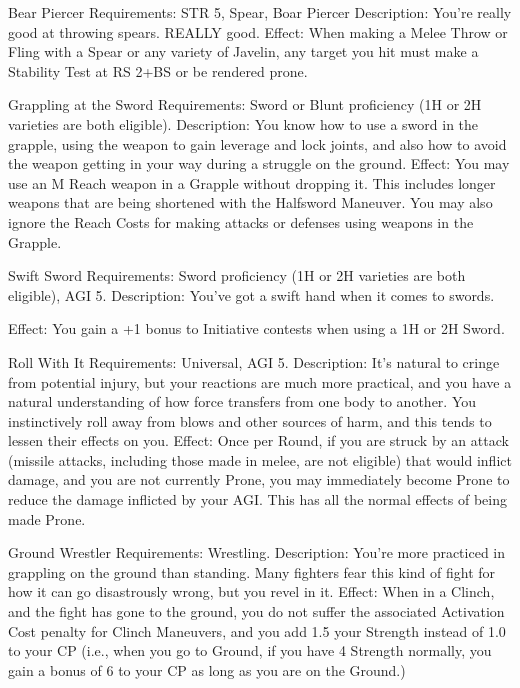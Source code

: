 \documentclass[oneside,11pt,english]{book}
\begin{document}
 

Bear Piercer 
Requirements: STR 5, Spear, Boar Piercer 
Description: You’re really good at throwing spears. REALLY good. 
Effect: When making a Melee Throw or Fling with a Spear or any variety of Javelin, any target you hit 
must make a Stability Test at RS 2+BS or be rendered prone. 

 

Grappling at the Sword 
Requirements: Sword or Blunt proficiency (1H or 2H varieties are both eligible). 
Description: You know how to use a sword in the grapple, using the weapon to gain leverage and lock 
joints, and also how to avoid the weapon getting in your way during a struggle on the ground. 
Effect: You may use an M Reach weapon in a Grapple without dropping it. This includes longer weapons 
that are being shortened with the Halfsword Maneuver. You may also ignore the Reach Costs for making 
attacks or defenses using weapons in the Grapple. 

 

Swift Sword 
Requirements: Sword proficiency (1H or 2H varieties are both eligible), AGI 5. 
Description: You’ve got a swift hand when it comes to swords. 


Effect: You gain a +1 bonus to Initiative contests when using a 1H or 2H Sword. 

 

Roll With It 
Requirements: Universal, AGI 5. 
Description: It's natural to cringe from potential injury, but your reactions are much more practical, and 
you have a natural understanding of how force transfers from one body to another. You instinctively roll 
away from blows and other sources of harm, and this tends to lessen their effects on you. 
Effect: Once per Round, if you are struck by an attack (missile attacks, including those made in melee, 
are not eligible) that would inflict damage, and you are not currently Prone, you may immediately become 
Prone to reduce the damage inflicted by your AGI. This has all the normal effects of being made Prone. 

 

Ground Wrestler 
Requirements: Wrestling. 
Description: You’re more practiced in grappling on the ground than standing. Many fighters fear this 
kind of fight for how it can go disastrously wrong, but you revel in it. 
Effect: When in a Clinch, and the fight has gone to the ground, you do not suffer the associated 
Activation Cost penalty for Clinch Maneuvers, and you add 1.5 your Strength instead of 1.0 to your CP 
(i.e., when you go to Ground, if you have 4 Strength normally, you gain a bonus of 6 to your CP as long 
as you are on the Ground.) 
\end{document}
